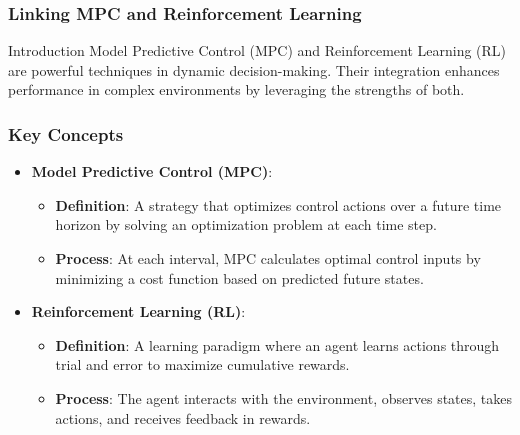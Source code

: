\documentclass[aspectratio=169]{beamer}
\begin{document}
\begin{frame}[fragile]
    \frametitle{Linking MPC and Reinforcement Learning}
    \begin{block}{Introduction}
        Model Predictive Control (MPC) and Reinforcement Learning (RL) are powerful techniques in dynamic decision-making. Their integration enhances performance in complex environments by leveraging the strengths of both.
    \end{block}
\end{frame}

\begin{frame}[fragile]
    \frametitle{Key Concepts}
    \begin{itemize}
        \item \textbf{Model Predictive Control (MPC)}:
            \begin{itemize}
                \item \textbf{Definition}: A strategy that optimizes control actions over a future time horizon by solving an optimization problem at each time step.
                \item \textbf{Process}: At each interval, MPC calculates optimal control inputs by minimizing a cost function based on predicted future states.
            \end{itemize}
        \item \textbf{Reinforcement Learning (RL)}:
            \begin{itemize}
                \item \textbf{Definition}: A learning paradigm where an agent learns actions through trial and error to maximize cumulative rewards.
                \item \textbf{Process}: The agent interacts with the environment, observes states, takes actions, and receives feedback in rewards.
            \end{itemize}
    \end{itemize}
\end{frame}
\end{document}
